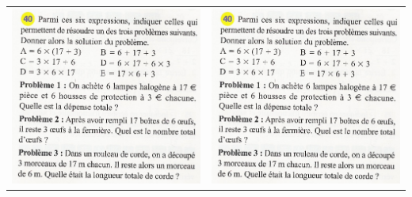 \documentclass[12pt, twoside]{article}
\begin{document}
\begin{tabular}{cc}
\begin{minipage}{9cm}
\includegraphics[width=8cm]{image/pb.jpg}
\end{minipage}
&
\begin{minipage}{9cm}
\includegraphics[width=8cm]{image/pb.jpg}
\end{minipage}

\end{tabular}

\bigskip
\end{document}
